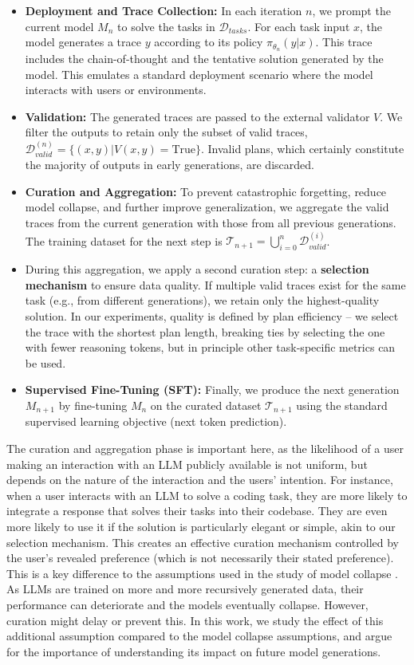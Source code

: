 \documentclass{article}
\renewcommand{\cite}[1]{\citep[][]{#1}}
\begin{document}
\begin{itemize}
    \item \textbf{Deployment and Trace Collection:} In each iteration $n$, we prompt the current model $M_n$ to solve the tasks in $\mathcal{D}_{tasks}$. For each task input $x$, the model generates a trace $y$ according to its policy $\pi_{\theta_n}(y|x)$. This trace includes the chain-of-thought and the tentative solution generated by the model. This emulates a standard deployment scenario where the model interacts with users or environments.
    \item \textbf{Validation:} The generated traces are passed to the external validator $V$. We filter the outputs to retain only the subset of valid traces, $\mathcal{D}_{valid}^{(n)} = \{(x, y) |V(x, y) = \text{True}\}$. Invalid plans, which certainly constitute the majority of outputs in early generations, are discarded.
    \item \textbf{Curation and Aggregation:} To prevent catastrophic forgetting, reduce model collapse, and further improve generalization, we aggregate the valid traces from the current generation with those from all previous generations. The training dataset for the next step is $\mathcal{T}_{n+1} = \bigcup_{i=0}^{n} \mathcal{D}_{valid}^{(i)}$.
    \item During this aggregation, we apply a second curation step: a \textbf{selection mechanism} to ensure data quality. If multiple valid traces exist for the same task (e.g., from different generations), we retain only the highest-quality solution. In our experiments, quality is defined by plan efficiency -- we select the trace with the shortest plan length, breaking ties by selecting the one with fewer reasoning tokens, but in principle other task-specific metrics can be used.
    \item \textbf{Supervised Fine-Tuning (SFT):} Finally, we produce the next generation $M_{n+1}$ by fine-tuning $M_n$ on the curated dataset $\mathcal{T}_{n+1}$ using the standard supervised learning objective (next token prediction).
\end{itemize}

The curation and aggregation phase is important here, as the likelihood of a
user making an interaction with an LLM publicly available is not uniform, but
depends on the nature of the interaction and the users' intention. For instance,
when a user interacts with an LLM to solve a coding task, they are more likely
to integrate a response that solves their tasks into their codebase. They are
even more likely to use it if the solution is particularly elegant or simple,
akin to our selection mechanism. This creates an effective curation mechanism
controlled by the user's revealed preference (which is not necessarily their
stated preference). This is a key difference to the assumptions used in the study of model collapse \cite{shumailov-et-al-nature2024}.
As LLMs are trained on more and more recursively generated data, their
performance can deteriorate and the models eventually collapse. However, curation might delay or prevent
this.
In this work, we study the effect of this additional assumption compared to the model collapse assumptions, and
argue for the importance of understanding its impact on future model
generations.
\end{document}
